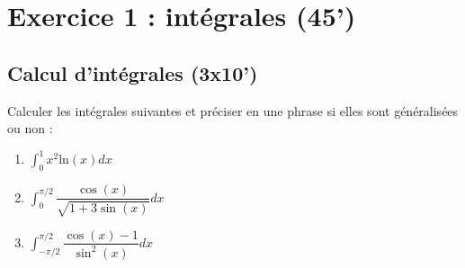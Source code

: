 \documentclass[fleqn]{article}
\begin{document}

\section{Exercice 1 : intégrales (45')}
\subsection{Calcul d'intégrales (3x10')}
Calculer les intégrales suivantes et préciser en une phrase si elles sont généralisées ou non :
\begin{enumerate}
   \item ${\displaystyle \int_0^1 x^2 \mathrm{ln}(x) dx}$ 
   \item ${\displaystyle \int_0^{\pi/2} \dfrac{\cos(x)}{\sqrt{1+3\sin(x)}}dx}$
   \item ${\displaystyle \int_{-\pi/2}^{\pi/2} \dfrac{\cos(x)-1}{\sin^2(x)}dx}$
\end{enumerate}
\end{document}
